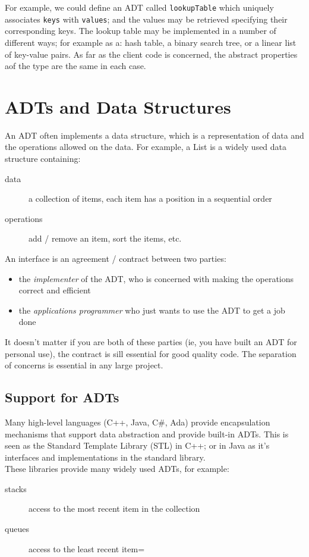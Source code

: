 For example, we could define an ADT called \verb|lookupTable| which uniquely associates \verb|keys| with \verb|values|; and the values may be retrieved specifying their corresponding keys. The lookup table may be implemented in a number of different ways; for example as a: hash table, a binary search tree, or a linear list of key-value pairs. As far as the client code is concerned, the abstract properties aof the type are the same in each case.

\section{ADTs and Data Structures}
An ADT often implements a data structure, which is a representation of data and the operations allowed on the data. For example, a List is a widely used data structure containing:
\begin{description}
    \item[data] a collection of items, each item has a position in a sequential order
    \item[operations] add / remove an item, sort the items, etc. 
\end{description}

An interface is an agreement / contract between two parties:
\begin{itemize}
    \item the \textit{implementer} of the ADT, who is concerned with making the operations correct and efficient
    \item the \textit{applications programmer} who just wants to use the ADT to get a job done
\end{itemize}
It doesn't matter if you are both of these parties (ie, you have built an ADT for personal use), the contract is sill essential for good quality code. The separation of concerns is essential in any large project.

\subsection{Support for ADTs}
Many high-level languages (C++, Java, C\#, Ada) provide encapsulation mechanisms that support data abstraction and provide built-in ADTs. This is seen as the Standard Template Library (STL) in C++; or in Java as it's interfaces and implementations in the standard library.\\

These libraries provide many widely used ADTs, for example:
\begin{description}
    \item[stacks] access to the most recent item in the collection
    \item[queues] access to the least recent item=
\end{description}


